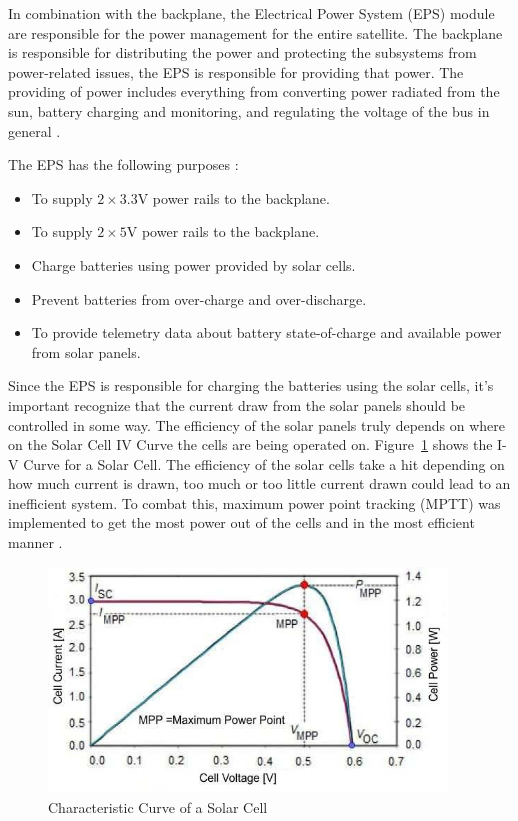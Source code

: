 \documentclass[12pt, a4paper]{report}
\begin{document}
In combination with the backplane, the Electrical Power System (EPS) module are responsible for the power management for the entire satellite. The backplane is responsible for distributing the power and protecting the subsystems from power-related issues, the EPS is responsible for providing that power. The providing of power includes everything from converting power radiated from the sun, battery charging and monitoring, and regulating the voltage of the bus in general \cite{power_distribution}.

The EPS has the following purposes \cite{power_distribution}:

\begin{itemize}
    \item To supply \(2 \times 3.3 \unit{\volt}\) power rails to the backplane.
    \item To supply \(2 \times 5 \unit{\volt}\) power rails to the backplane.
    \item Charge batteries using power provided by solar cells.
    \item Prevent batteries from over-charge and over-discharge.
    \item To provide telemetry data about battery state-of-charge and available power from solar panels.
\end{itemize}

Since the EPS is responsible for charging the batteries using the solar cells, it's important recognize that the current draw from the solar panels should be controlled in some way. The efficiency of the solar panels truly depends on where on the Solar Cell IV Curve the cells are being operated on. Figure~\ref{fig:solar_iv} shows the I-V Curve for a Solar Cell. The efficiency of the solar cells take a hit depending on how much current is drawn, too much or too little current drawn could lead to an inefficient system. To combat this, maximum power point tracking (MPTT) was implemented to get the most power out of the cells and in the most efficient manner \cite{power_distribution}. 

\begin{figure}[H]
    \centering
    \includegraphics[width=300pt]{images/solar_iv.png}
    \caption{Characteristic Curve of a Solar Cell \cite{solar_cell}}
    \label{fig:solar_iv}
\end{figure}
\end{document}
